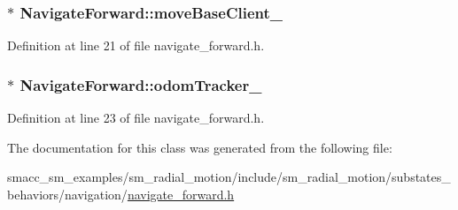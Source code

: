 \subsubsection[{\texorpdfstring{move\+Base\+Client\+\_\+}{moveBaseClient_}}]{$\ast$ Navigate\+Forward\+::move\+Base\+Client\+\_\+}\hypertarget{classNavigateForward_adeec3efc00297e64467a83d5ef82c44c}{}\label{classNavigateForward_adeec3efc00297e64467a83d5ef82c44c}


Definition at line 21 of file navigate\+\_\+forward.\+h.

\subsubsection[{\texorpdfstring{odom\+Tracker\+\_\+}{odomTracker_}}]{$\ast$ Navigate\+Forward\+::odom\+Tracker\+\_\+}\hypertarget{classNavigateForward_a1805443ef8d8fe292af6bde6298e43c9}{}\label{classNavigateForward_a1805443ef8d8fe292af6bde6298e43c9}


Definition at line 23 of file navigate\+\_\+forward.\+h.



The documentation for this class was generated from the following file\+:\begin{DoxyCompactItemize}
\item 
smacc\+\_\+sm\+\_\+examples/sm\+\_\+radial\+\_\+motion/include/sm\+\_\+radial\+\_\+motion/substates\+\_\+behaviors/navigation/\hyperlink{navigate__forward_8h}{navigate\+\_\+forward.\+h}\end{DoxyCompactItemize}
